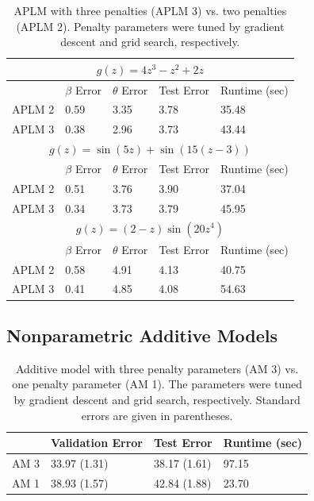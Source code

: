 \documentclass{statsoc}
\begin{document}
\begin{table}
\caption{\label{ref:aplm} APLM with three penalties (APLM 3) vs. two penalties (APLM 2). Penalty parameters were tuned by gradient descent and grid search, respectively.}
\centering
\begin{tabular}{| l | l | l | l | l | }
\hline
\multicolumn{5}{|c|}{$g(z) = 4z^3 - z^2 + 2z$}\\
\hline
 & $\beta$ Error & $\theta$ Error & Test Error & Runtime (sec) \\
\hline
APLM 2 & 0.59 & 3.35 & 3.78 & 35.48 \\
\hline
APLM 3 & 0.38 & 2.96 & 3.73 & 43.44 \\
\hline
\multicolumn{5}{|c|}{$g(z) = \sin(5z) + \sin(15(z - 3))$}\\
\hline
 & $\beta$ Error & $\theta$ Error & Test Error & Runtime (sec) \\
\hline
APLM 2 & 0.51 & 3.76 & 3.90 & 37.04 \\
\hline
APLM 3 & 0.34 & 3.73 & 3.79 & 45.95 \\
\hline
\multicolumn{5}{|c|}{$g(z) = (2-z)\sin(20z^4)$}\\
\hline
 & $\beta$ Error & $\theta$ Error & Test Error & Runtime (sec) \\
\hline
APLM 2 & 0.58 & 4.91 & 4.13 & 40.75 \\
\hline
APLM 3 & 0.41 & 4.85 & 4.08 & 54.63 \\
\hline
\end{tabular}
\end{table}

\subsection{Nonparametric Additive Models}

\begin{table}
\caption {\label{tab:additive} Additive model with three penalty parameters (AM 3) vs. one penalty parameter (AM 1). The parameters were tuned by gradient descent and grid search, respectively. Standard errors are given in parentheses.}
\centering
\begin{tabular}{| l | l | l | l | }
\hline
& Validation Error & Test Error & Runtime (sec) \\
\hline
AM 3 & 33.97 (1.31) & 38.17 (1.61) & 97.15 \\
\hline
AM 1 & 38.93 (1.57) & 42.84 (1.88) & 23.70 \\
\hline
\end{tabular}
\end{table}
\end{document}
